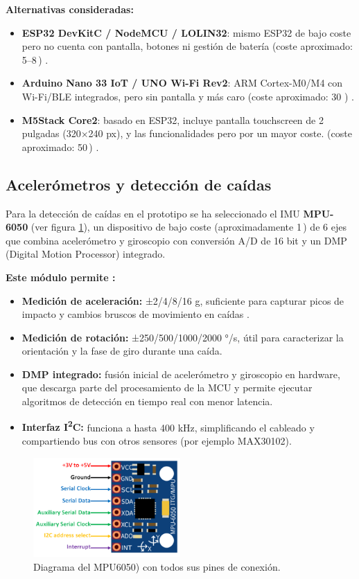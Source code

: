 \documentclass[12pt, a4paper]{article}
\begin{document}
	\noindent\textbf{Alternativas consideradas:}
	\begin{itemize}
		\item \textbf{ESP32 DevKitC / NodeMCU / LOLIN32}: mismo ESP32 de bajo coste pero no cuenta con pantalla, botones ni gestión de batería (coste aproximado: 5–8\,\texteuro{}) \cite{ESP32DevKitC2018}.
		\item \textbf{Arduino Nano 33 IoT / UNO Wi-Fi Rev2}: ARM Cortex-M0/M4 con Wi-Fi/BLE integrados, pero sin pantalla y más caro (coste aproximado: 30 \texteuro{}) \cite{ArduinoNano33IoT2019}.
		\item \textbf{M5Stack Core2}: basado en ESP32, incluye pantalla touchscreen de 2 pulgadas (320×240 px), y las funcionalidades pero por un mayor coste. (coste aproximado: 50\,\texteuro{}) \cite{M5StackCore22020}.
	\end{itemize}
	
	
	\subsection{Acelerómetros y detección de caídas}
	
	Para la detección de caídas en el prototipo se ha seleccionado el IMU \textbf{MPU-6050} (ver figura \ref{fig:mpu}), un dispositivo de bajo coste (aproximadamente 1\,\texteuro{}) de 6 ejes que combina acelerómetro y giroscopio con conversión A/D de 16 bit y un DMP (Digital Motion Processor) integrado. 	
	
	\noindent\textbf{Este módulo permite \cite{MPU6050Datasheet}:}
	\begin{itemize}
		\item \textbf{Medición de aceleración:} ±2/4/8/16 g, suficiente para capturar picos de impacto y cambios bruscos de movimiento en caídas .
		\item \textbf{Medición de rotación:} ±250/500/1000/2000 °/s, útil para caracterizar la orientación y la fase de giro durante una caída.
		\item \textbf{DMP integrado:} fusión inicial de acelerómetro y giroscopio en hardware, que descarga parte del procesamiento de la MCU y permite ejecutar algoritmos de detección en tiempo real con menor latencia.
		\item \textbf{Interfaz I\textsuperscript{2}C:} funciona a hasta 400 kHz, simplificando el cableado y compartiendo bus con otros sensores (por ejemplo MAX30102).
	\end{itemize}
	
	\begin{figure}[htbp]
		\centering
		\includegraphics[width=0.5\textwidth]{images/MPU6050.png}
		\caption[Diagrama de pines del MPU6050]{Diagrama del  \mbox{MPU6050)} con todos sus pines de conexión.}
		\label{fig:mpu}
	\end{figure}
	
\end{document}

